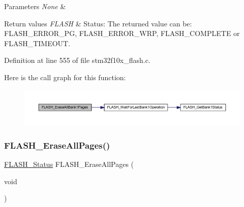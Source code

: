\begin{DoxyParams}{Parameters}
{\em None} & \\
\hline
\end{DoxyParams}

\begin{DoxyRetVals}{Return values}
{\em F\+L\+A\+SH} & Status\+: The returned value can be\+: F\+L\+A\+S\+H\+\_\+\+E\+R\+R\+O\+R\+\_\+\+PG, F\+L\+A\+S\+H\+\_\+\+E\+R\+R\+O\+R\+\_\+\+W\+RP, F\+L\+A\+S\+H\+\_\+\+C\+O\+M\+P\+L\+E\+TE or F\+L\+A\+S\+H\+\_\+\+T\+I\+M\+E\+O\+UT. \\
\hline
\end{DoxyRetVals}


Definition at line 555 of file stm32f10x\+\_\+flash.\+c.

Here is the call graph for this function\+:
\nopagebreak
\begin{figure}[H]
\begin{center}
\leavevmode
\includegraphics[width=350pt]{group___f_l_a_s_h___private___functions_ga2036728450ee18e789b25fe3fd9c80ee_cgraph}
\end{center}
\end{figure}
\mbox{\label{group___f_l_a_s_h___private___functions_gab2e6dea62c72b3e47c17512579d37498}} 
\subsubsection{\texorpdfstring{F\+L\+A\+S\+H\+\_\+\+Erase\+All\+Pages()}{FLASH\_EraseAllPages()}}
{\footnotesize\ttfamily \hyperlink{group___f_l_a_s_h___exported___types_gadc63a6f3404ff1f71229a66915e9cdc0}{F\+L\+A\+S\+H\+\_\+\+Status} F\+L\+A\+S\+H\+\_\+\+Erase\+All\+Pages (\begin{DoxyParamCaption}\item[{void}]{ }\end{DoxyParamCaption})}



